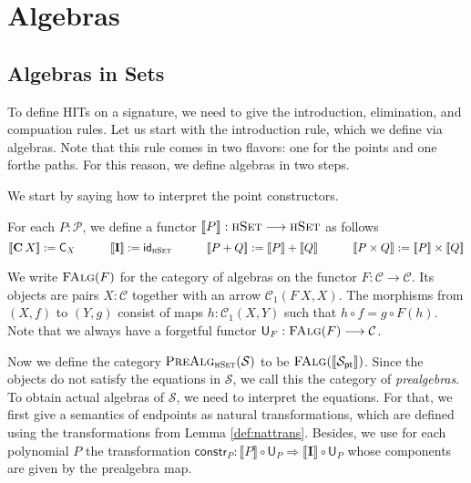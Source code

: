 \documentclass[9pt]{entcs}
\newcommand{\type}[1]{\textsc{#1}}
\newcommand{\constructor}[1]{\mathbf{#1}}
\newcommand{\category}[1]{\textsc{#1}}
\newcommand{\functortxt}[1]{\mathsf{#1}}
\newcommand{\nattranstxt}[1]{\mathsf{#1}}
\newcommand{\hset}{\type{hSet}} %
\newcommand{\0}{\textbf{0}} %
\newcommand{\Def}{:=} %
\newcommand{\functor}[2]{#1 \longrightarrow #2} %
\newcommand{\idf}[1]{\functortxt{id}_{#1}} %
\newcommand{\Cf}[1]{\functortxt{C}_{#1}} %
\newcommand{\compf}[2]{#2 \circ #1} %
\newcommand{\prodf}[2]{#1 \times #2} %
\newcommand{\sumf}[2]{#1 + #2} %
\newcommand{\nattrans}[2]{#1 \Longrightarrow #2} %
\newcommand{\constrt}[1]{\nattranstxt{constr}_{#1}} %
\newcommand{\falg}[1]{\category{FAlg}(#1)} %
\newcommand{\poly}{\mathcal{P}} %
\newcommand{\C}{\constructor{C}} %
\newcommand{\I}{\constructor{I}} %
\newcommand{\sumP}[2]{#1 + #2} %
\newcommand{\prodP}[2]{#1 \times #2} %
\newcommand{\pt}[0]{\textsf{pt}}
\newcommand{\pointc}[1]{#1_{\pt}} %
\newcommand{\sig}{\mathcal{S}} %
\newcommand{\semP}[1]{\llbracket #1 \rrbracket} %
\newcommand{\prealg}[1]{\category{PreAlg}_{\hset}(#1)} %
\newcommand{\forget}[1]{\functortxt{U}_{#1}} %
\newcommand{\remove}[1]{} %
\begin{document}
\section{Algebras}
\label{sec:algebras}

\subsection{Algebras in Sets}
To define HITs on a signature, we need to give the introduction, elimination, and compuation rules.
Let us start with the introduction rule, which we define via algebras.
Note that this rule comes in two flavors: one for the points and one forthe paths.
For this reason, we define algebras in two steps. 

We start by saying how to interpret the point constructors.

\begin{definition}
\label{def:sempoly}
For each $P : \poly$, we define a functor $\semP{P} : \functor{\hset}{\hset}$ as follows
\[
\semP{\C \> X} \Def \Cf{X}
\quad \quad \quad
\semP{\I} \Def \idf{\hset}
\quad \quad \quad
\semP{\sumP{P}{Q}} \Def \sumf{\semP{P}}{\semP{Q}}
\quad \quad \quad
\semP{\prodP{P}{Q}} \Def \prodf{\semP{P}}{\semP{Q}}
\]
\remove{
\begin{itemize}
	\item $\semP{\C \> X} \Def \Cf{X}$;
	\item $\semP{\I} \Def \idf{\hset}$;
	\item $\semP{\sumP{P}{Q}} \Def \sumf{\semP{P}}{\semP{Q}}$;
	\item $\semP{\sumP{P}{Q}} \Def \prodf{\semP{P}}{\semP{Q}}$.
\end{itemize}
}
\end{definition}

We write $\falg{F}$ for the category of algebras on the functor $F : \functor{\mathcal{C}}{\mathcal{C}}$.
Its objects are pairs $X : \mathcal{C}$ together with an arrow $\mathcal{C}_1(F \> X, X)$.
The morphisms from $(X, f)$ to $(Y, g)$ consist of maps $h : \mathcal{C}_1(X,Y)$ such that $h \circ f = g \circ F(h)$.
Note that we always have a forgetful functor $\forget{F} : \functor{\falg{F}}{\mathcal{C}}$.

Now we define the category $\prealg{\sig}$ to be $\falg{\semP{\pointc{\sig}}}$.
Since the objects do not satisfy the equations in $\sig$, we call this the category of \emph{prealgebras}.
To obtain actual algebras of $\sig$, we need to interpret the equations.
For that, we first give a semantics of endpoints as natural transformations, which are defined using the transformations from Lemma \ref{def:nattrans}.
Besides, we use for each polynomial $P$ the transformation $\constrt{P} : \nattrans{\compf{\forget{P}}{\semP{P}}}{\compf{\forget{P}}{\semP{\I}}}$ whose  components are given by the prealgebra map.
\end{document}
